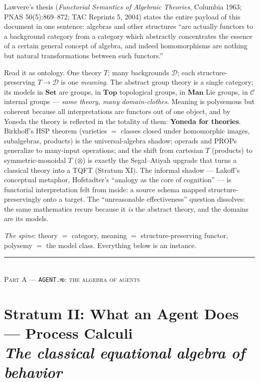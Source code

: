 \documentclass[11pt]{article}
\theoremstyle{plain}
\theoremstyle{definition}
\theoremstyle{remark}
\newcommand{\C}{\mathcal{C}}
\newcommand{\D}{\mathcal{D}}
\newcommand{\Set}{\mathbf{Set}}
\newcommand{\stratum}[2]{\section{#1\\ {\normalsize\normalfont\itshape #2}}}
\begin{document}
Lawvere's thesis (\emph{Functorial Semantics of Algebraic Theories}, Columbia 1963; PNAS 50(5):869--872; TAC Reprints 5, 2004) states the entire payload of this document in one sentence: algebras and other structures ``are actually functors to a background category from a category which abstractly concentrates the essence of a certain general concept of algebra, and indeed homomorphisms are nothing but natural transformations between such functors.''

Read it as ontology. One theory $T$; many backgrounds $\D$; each structure-preserving $T \to \D$ is one \emph{meaning}. The abstract group theory is a single category; its models in $\Set$ are groups, in $\mathbf{Top}$ topological groups, in $\mathbf{Man}$ Lie groups, in $\C$ internal groups --- \emph{same theory, many domain-clothes}. Meaning is polysemous but coherent because all interpretations are functors out of one object, and by Yoneda the theory is reflected in the totality of them: \textbf{Yoneda for theories}. Birkhoff's HSP theorem (varieties $=$ classes closed under homomorphic images, subalgebras, products) is the universal-algebra shadow; operads and PROPs generalize to many-input operations; and the shift from cartesian $T$ (products) to symmetric-monoidal $T$ ($\otimes$) is exactly the Segal--Atiyah upgrade that turns a classical theory into a TQFT (Stratum XI). The informal shadow --- Lakoff's conceptual metaphor, Hofstadter's ``analogy as the core of cognition'' --- is functorial interpretation felt from inside: a source schema mapped structure-preservingly onto a target. The ``unreasonable effectiveness'' question dissolves: the same mathematics recurs because it \emph{is} the abstract theory, and the domains are its models.

\begin{refrain}
\emph{The spine}: theory $=$ category, meaning $=$ structure-preserving functor, polysemy $=$ the model class. Everything below is an instance.
\end{refrain}

\begin{center}\color{silmaril}\rule{0.25\textwidth}{0.4pt}\\[0.3em]\textsc{Part A --- \texttt{AGENT.md}: the algebra of agents}\end{center}

\stratum{Stratum II: What an Agent Does --- Process Calculi}{The classical equational algebra of behavior}
\end{document}
